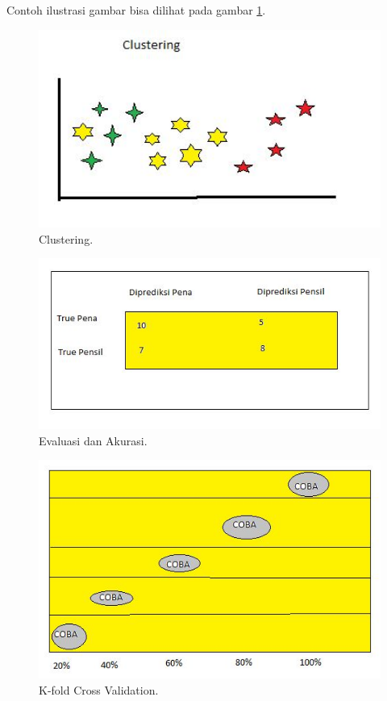\subitem Contoh ilustrasi gambar bisa dilihat pada gambar \ref{4}.
\begin{figure}[ht]
		\centerline{\includegraphics[width=1\textwidth]{figures/huda/clustering.JPG}}
		\caption{Clustering.}
		\label{4}
\end{figure}
\begin{figure}[ht]
		\centerline{\includegraphics[width=1\textwidth]{figures/huda/evaluasidanakurasi.JPG}}
		\caption{Evaluasi dan Akurasi.}
		\label{5}
\end{figure}
\begin{figure}[ht]
		\centerline{\includegraphics[width=1\textwidth]{figures/huda/K-fold.JPG}}
		\caption{K-fold Cross Validation.}
		\label{6}
\end{figure}
